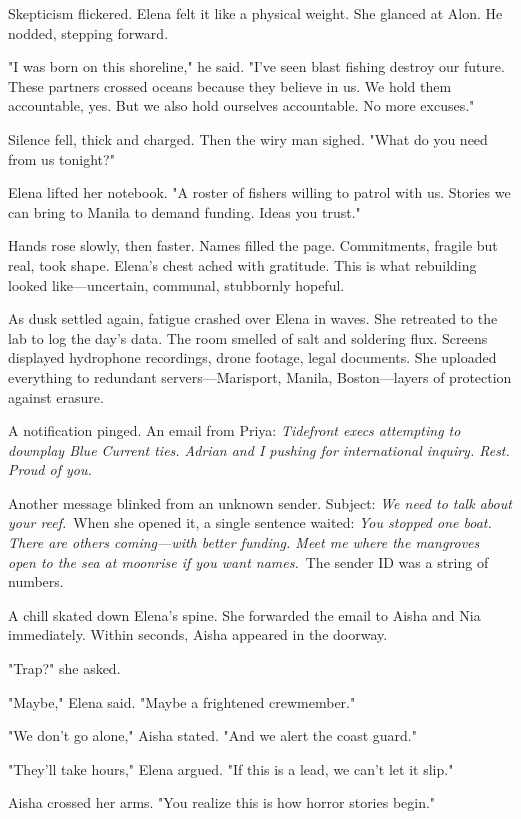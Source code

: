 Skepticism flickered. Elena felt it like a physical weight. She glanced at Alon. He nodded, stepping forward.

"I was born on this shoreline," he said. "I've seen blast fishing destroy our future. These partners crossed oceans because they believe in us. We hold them accountable, yes. But we also hold ourselves accountable. No more excuses."

Silence fell, thick and charged. Then the wiry man sighed. "What do you need from us tonight?"

Elena lifted her notebook. "A roster of fishers willing to patrol with us. Stories we can bring to Manila to demand funding. Ideas you trust."

Hands rose slowly, then faster. Names filled the page. Commitments, fragile but real, took shape. Elena's chest ached with gratitude. This is what rebuilding looked like—uncertain, communal, stubbornly hopeful.

\bigskip

As dusk settled again, fatigue crashed over Elena in waves. She retreated to the lab to log the day's data. The room smelled of salt and soldering flux. Screens displayed hydrophone recordings, drone footage, legal documents. She uploaded everything to redundant servers—Marisport, Manila, Boston—layers of protection against erasure.

A notification pinged. An email from Priya: \textit{Tidefront execs attempting to downplay Blue Current ties. Adrian and I pushing for international inquiry. Rest. Proud of you.}\

Another message blinked from an unknown sender. Subject: \textit{We need to talk about your reef.}\ When she opened it, a single sentence waited: \textit{You stopped one boat. There are others coming—with better funding. Meet me where the mangroves open to the sea at moonrise if you want names.}\ The sender ID was a string of numbers.

A chill skated down Elena's spine. She forwarded the email to Aisha and Nia immediately. Within seconds, Aisha appeared in the doorway.

"Trap?" she asked.

"Maybe," Elena said. "Maybe a frightened crewmember."

"We don't go alone," Aisha stated. "And we alert the coast guard."

"They'll take hours," Elena argued. "If this is a lead, we can't let it slip."

Aisha crossed her arms. "You realize this is how horror stories begin."

